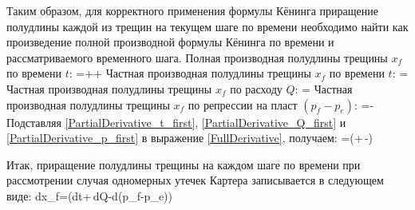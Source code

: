 Таким образом, для корректного применения формулы Кёнинга приращение полудлины каждой из трещин на текущем шаге по времени необходимо найти как произведение полной производной формулы Кёнинга по времени и рассматриваемого временного шага.\newline
Полная производная полудлины трещины $x_{\!f}$ по времени $t$:
\beq\label{FullDerivative}
=++
\eeq
Частная производная полудлины трещины $x_{\!f}$ по времени $t$:
\beq\label{PartialDerivative_t_first}
=
\eeq
Частная производная полудлины трещины $x_{\!f}$ по расходу $Q$:
\beq\label{PartialDerivative_Q_first}
=
\eeq
Частная производная полудлины трещины $x_{\!f}$ по репрессии на пласт $\left(p_{\!f}-p_e\right)$:
\beq\label{PartialDerivative_p_first}
=-
\eeq
Подставляя \eqref{PartialDerivative_t_first}, \eqref{PartialDerivative_Q_first} и \eqref{PartialDerivative_p_first} в выражение \eqref{FullDerivative}, получаем:
\beq\label{FullDerivativeExplicit_first}
=\left(+\,-\right)
\eeq
             
Итак, приращение полудлины трещины на каждом шаге по времени при рассмотрении случая одномерных утечек Картера записывается в следующем виде:
\beq\label{IncrementExplicit_first}
dx_{\!f}=\left(dt+\,dQ-d(p_{\!f}-p_e)\right)
\eeq\\

